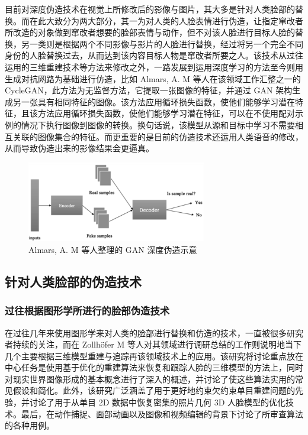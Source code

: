 目前对深度伪造技术在视觉上所修改后的影像与图片，其大多是针对人类脸部的替换。而在此大致分为两大部分，其一为对人类的人脸表情进行伪造，让指定窜改者所改造的对象做到窜改者想要的脸部表情与动作，但不对该人脸进行目标人脸的替换，另一类则是根据两个不同影像与影片的人脸进行替换，经过将另一个完全不同身份的人脸替换过去，从而达到该内容目标人物是窜改者所要之人。该技术从过往运用的三维重建技术等方法来修改之外，一路发展到运用深度学习的方法至今则用生成对抗网路为基础进行仿造，比如 Almars, A. M 等人在该领域工作汇整之一的 CycleGAN，此方法为无监督方法，它提取一张图像的特征，并通过 GAN 架构生成另一张具有相同特征的图像。该方法应用循环损失函数，使他们能够学习潜在特征，且该方法应用循环损失函数，使他们能够学习潜在特征，可以在不使用配对示例的情况下执行图像到图像的转换。换句话说，该模型从源和目标中学习不需要相互关联的图像集合的特征。而更重要的是目前的仿造技术还运用人类语音的修改，从而导致伪造出来的影像结果会更逼真。

\begin{figure}[htb]
\centering 
\includegraphics[width=0.70\textwidth]{img/ch1m2.png} 
\caption{Almars, A. M 等人整理的 GAN 深度伪造示意}
\label{Test}
\end{figure}

\subsection{针对人类脸部的伪造技术}

\subsubsection{过往根据图形学所进行的脸部伪造技术}

在过往几年来使用图形学来对人类的脸部进行替换和仿造的技术，一直被很多研究者持续的关注，而在 Zollhöfer M 等人对其领域进行调研总结的工作则说明地当下几个主要根据三维模型重建与追踪再该领域技术上的应用。该研究将讨论重点放在中心任务是使用基于优化的重建算法来恢复和跟踪人脸的三维模型的方法上，同时对现实世界图像形成的基本概念进行了深入的概述，并讨论了使这些算法实用的常见假设和简化。此外，该研究广泛涵盖了用于更好地约束欠约束单目重建问题的先验，并讨论了用于从单目 2D 数据中恢复密集的照片几何 3D 人脸模型的优化技术。最后，在动作捕捉、面部动画以及图像和视频编辑的背景下讨论了所审查算法的各种用例。


